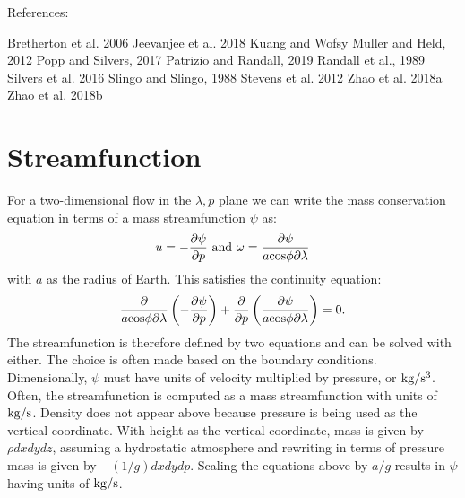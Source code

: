 \documentclass[draft]{agujournal2019}
\begin{document}
References: 

Bretherton et al. 2006
Jeevanjee et al. 2018
Kuang and Wofsy
Muller and Held, 2012
Popp and Silvers, 2017
Patrizio and Randall, 2019
Randall et al., 1989
Silvers et al. 2016
Slingo and Slingo, 1988
Stevens et al. 2012
Zhao et al. 2018a
Zhao et al. 2018b





\appendix


\section{Streamfunction}

For a two-dimensional flow in the $\lambda,p$ plane we can write the mass conservation equation in terms of a 
mass streamfunction $\psi$ as: 
\begin{equation}
u =  -\frac{\partial \psi}{\partial p}   \,\, {\rm and} \,\, \omega =\frac{\partial \psi}{a \rm{cos} \phi \partial \lambda}
\end{equation}
with $a$ as the radius of Earth.
This satisfies the continuity equation: 
\begin{equation}
\frac{\partial}{a \rm{cos} \phi\partial\lambda}\left(-\frac{\partial \psi}{\partial p}\right)+\frac{\partial}{\partial p}\left(\frac{\partial \psi}{a \rm{cos}\phi \partial \lambda}\right)=0.
\end{equation}
The streamfunction is therefore defined by two equations and can be solved with either.  The choice is often made based on the 
boundary conditions.  Dimensionally, $\psi$ must have units of velocity multiplied by pressure, or $\rm{kg/s^3}$.  Often, the streamfunction
is computed as a mass streamfunction with units of $\rm{kg/s}$.  Density does not appear above
because pressure is being used as the vertical coordinate.   With height as the vertical coordinate, mass is given by $\rho dxdydz$, 
assuming a hydrostatic atmosphere and rewriting in terms of pressure mass is given by $-(1/g) dxdydp$.
Scaling the equations above by $a/g$ results in $\psi$ having units of $\rm{kg/s}$.  
\end{document}
